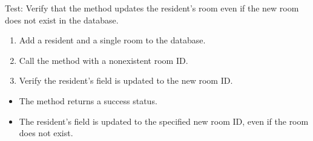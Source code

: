 \documentclass[letterpaper,10pt,english]{sphinxmanual}
\begin{document}
\begin{fulllineitems}
\label{\detokenize{test:test.test_residetnt.test_update_resident_room_room_not_found}}
\pysigstartsignatures
\pysiglinewithargsret
{}
{}
{}
\pysigstopsignatures
\sphinxAtStartPar
Test: Verify that the method updates the resident’s room even if the new room does not exist in the database.
\begin{description}
\begin{enumerate}
%
\item {} 
\sphinxAtStartPar
Add a resident and a single room to the database.

\item {} 
\sphinxAtStartPar
Call the  method with a non\sphinxhyphen{}existent room ID.

\item {} 
\sphinxAtStartPar
Verify the resident’s  field is updated to the new room ID.

\end{enumerate}

\begin{itemize}
\item {} 
\sphinxAtStartPar
The method returns a success status.

\item {} 
\sphinxAtStartPar
The resident’s  field is updated to the specified new room ID, even if the room does not exist.

\end{itemize}

\end{description}

\end{fulllineitems}

\end{document}
